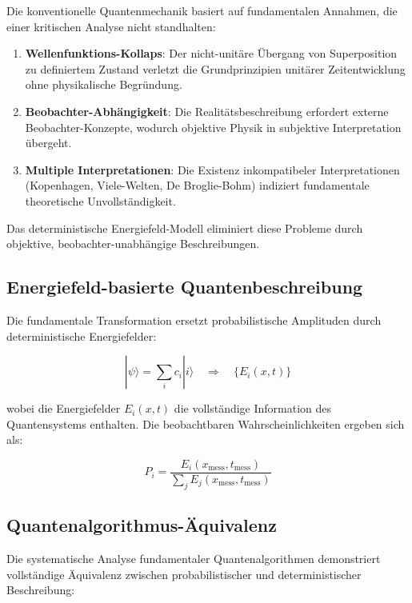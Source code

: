 \documentclass[12pt,a4paper]{report}
\begin{document}
	Die konventionelle Quantenmechanik basiert auf fundamentalen Annahmen, die einer kritischen Analyse nicht standhalten:
	
	\begin{enumerate}
		\item \textbf{Wellenfunktions-Kollaps}: Der nicht-unitäre Übergang von Superposition zu definiertem Zustand verletzt die Grundprinzipien unitärer Zeitentwicklung ohne physikalische Begründung.
		
		\item \textbf{Beobachter-Abhängigkeit}: Die Realitätsbeschreibung erfordert externe Beobachter-Konzepte, wodurch objektive Physik in subjektive Interpretation übergeht.
		
		\item \textbf{Multiple Interpretationen}: Die Existenz inkompatibeler Interpretationen (Kopenhagen, Viele-Welten, De Broglie-Bohm) indiziert fundamentale theoretische Unvollständigkeit.
	\end{enumerate}
	
	Das deterministische Energiefeld-Modell eliminiert diese Probleme durch objektive, beobachter-unabhängige Beschreibungen.
	
	\subsection{Energiefeld-basierte Quantenbeschreibung}
	
	Die fundamentale Transformation ersetzt probabilistische Amplituden durch deterministische Energiefelder:
	
	\begin{equation}
		|\psi\rangle = \sum_i c_i |i\rangle \quad \Rightarrow \quad \{E_i(x,t)\}
	\end{equation}
	
	wobei die Energiefelder $E_i(x,t)$ die vollständige Information des Quantensystems enthalten. Die beobachtbaren Wahrscheinlichkeiten ergeben sich als:
	
	\begin{equation}
		P_i = \frac{E_i(x_{\text{mess}}, t_{\text{mess}})}{\sum_j E_j(x_{\text{mess}}, t_{\text{mess}})}
	\end{equation}
	
	\subsection{Quantenalgorithmus-Äquivalenz}
	
	Die systematische Analyse fundamentaler Quantenalgorithmen demonstriert vollständige Äquivalenz zwischen probabilistischer und deterministischer Beschreibung:
	
\end{document}
